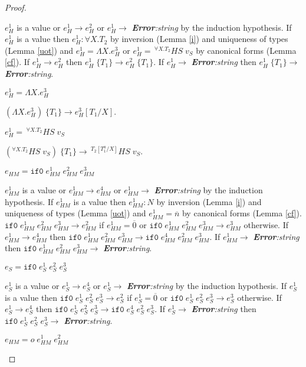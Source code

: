 \begin{theorem}
\begin{proof}
\begin{case}
$e_{H}^{1}$ is a value or $e_{H}^{1}\rightarrow e_{H}^{2}$ or $e_{H}^{1}\rightarrow$ \emph{\textbf{Error}:\;string} by the induction hypothesis.  If $e_{H}^{1}$ is a value then $e_{H}^{1}:\forall X.T_{2}$ by inversion (Lemma \ref{i}) and uniqueness of types (Lemma \ref{uot}) and $e_{H}^{1}=\Lambda X.e_{H}^{3}$ or $e_{H}^{1}=\,^{\forall X.T_{2}}HS\;v_{S}$ by canonical forms (Lemma \ref{cf}).  If $e_{H}^{1}\rightarrow e_{H}^{2}$ then $e_{H}^{1}\;\lbrace T_{1}\rbrace\rightarrow e_{H}^{2}\;\lbrace T_{1}\rbrace$.  If $e_{H}^{1}\rightarrow$ \emph{\textbf{Error}:\;string} then $e_{H}^{1}\;\lbrace T_{1}\rbrace\rightarrow$ \emph{\textbf{Error}:\;string}.
\end{case}
\begin{subcase}
$e_{H}^{1}=\Lambda X.e_{H}^{3}$

$(\Lambda X.e_{H}^{3})\;\lbrace T_{1}\rbrace\rightarrow e_{H}^{3}[T_{1}/X]$.
\end{subcase}
\begin{subcase}
$e_{H}^{1}=\,^{\forall X.T_{2}}HS\;v_{S}$

$(^{\forall X.T_{2}}HS\;v_{S})\;\lbrace T_{1}\rbrace\rightarrow\,^{T_{2}[T_{1}^{a}/X]}HS\;v_{S}$.
\end{subcase}
\begin{case}
$e_{HM}=\mathtt{if0}\;e_{HM}^{1}\;e_{HM}^{2}\;e_{HM}^{3}$

$e_{HM}^{1}$ is a value or $e_{HM}^{1}\rightarrow e_{HM}^{4}$ or $e_{HM}^{1}\rightarrow$ \emph{\textbf{Error}:\;string} by the induction hypothesis.  If $e_{HM}^{1}$ is a value then $e_{HM}^{1}:N$ by inversion (Lemma \ref{i}) and uniqueness of types (Lemma \ref{uot}) and $e_{HM}^{1}=\overline{n}$ by canonical forms (Lemma \ref{cf}).  $\mathtt{if0}\;e_{HM}^{1}\;e_{HM}^{2}\;e_{HM}^{3}\rightarrow e_{HM}^{2}$ if $e_{HM}^{1}=\overline{0}$ or $\mathtt{if0}\;e_{HM}^{1}\;e_{HM}^{2}\;e_{HM}^{3}\rightarrow e_{HM}^{3}$ otherwise.  If $e_{HM}^{1}\rightarrow e_{HM}^{4}$ then $\mathtt{if0}\;e_{HM}^{1}\;e_{HM}^{2}\;e_{HM}^{3}\rightarrow \mathtt{if0}\;e_{HM}^{4}\;e_{HM}^{2}\;e_{HM}^{3}$.  If $e_{HM}^{1}\rightarrow$ \emph{\textbf{Error}:\;string} then $\mathtt{if0}\;e_{HM}^{1}\;e_{HM}^{2}\;e_{HM}^{3}\rightarrow$ \emph{\textbf{Error}:\;string}.
\end{case}
\begin{case}
$e_{S}=\mathtt{if0}\;e_{S}^{1}\;e_{S}^{2}\;e_{S}^{3}$

$e_{S}^{1}$ is a value or $e_{S}^{1}\rightarrow e_{S}^{4}$ or $e_{S}^{1}\rightarrow$ \emph{\textbf{Error}:\;string} by the induction hypothesis.  If $e_{S}^{1}$ is a value then $\mathtt{if0}\;e_{S}^{1}\;e_{S}^{2}\;e_{S}^{3}\rightarrow e_{S}^{2}$ if $e_{S}^{1}=\overline{0}$ or $\mathtt{if0}\;e_{S}^{1}\;e_{S}^{2}\;e_{S}^{3}\rightarrow e_{S}^{3}$ otherwise.  If $e_{S}^{1}\rightarrow e_{S}^{4}$ then $\mathtt{if0}\;e_{S}^{1}\;e_{S}^{2}\;e_{S}^{3}\rightarrow \mathtt{if0}\;e_{S}^{4}\;e_{S}^{2}\;e_{S}^{3}$.  If $e_{S}^{1}\rightarrow$ \emph{\textbf{Error}:\;string} then $\mathtt{if0}\;e_{S}^{1}\;e_{S}^{2}\;e_{S}^{3}\rightarrow$ \emph{\textbf{Error}:\;string}.
\end{case}
\begin{case}
$e_{HM}=o\;e_{HM}^{1}\;e_{HM}^{2}$


\end{case}
\end{proof}
\end{theorem}
